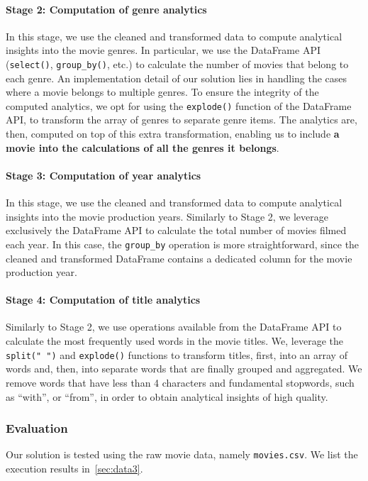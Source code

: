\documentclass[acmlarge]{acmart}
\begin{document}
  \paragraph{Stage 2: Computation of genre analytics} In this stage, we use the cleaned and transformed data to compute analytical insights into the movie genres. In particular, we use the DataFrame API (\texttt{select()}, \texttt{group\_by()}, etc.) to calculate the number of movies that belong to each genre. An implementation detail of our solution lies in handling the cases where a movie belongs to multiple genres. To ensure the integrity of the computed analytics, we opt for using the \texttt{explode()} function of the DataFrame API, to transform the array of genres to separate genre items. The analytics are, then, computed on top of this extra transformation, enabling us to include \textbf{a movie into the calculations of all the genres it belongs}.

  \paragraph{Stage 3: Computation of year analytics} In this stage, we use the cleaned and transformed data to compute analytical insights into the movie production years. Similarly to Stage 2, we leverage exclusively the DataFrame API to calculate the total number of movies filmed each year. In this case, the \texttt{group\_by} operation is more straightforward, since the cleaned and transformed DataFrame contains a dedicated column for the movie production year.

  \paragraph{Stage 4: Computation of title analytics} Similarly to Stage 2, we use operations available from the DataFrame API to calculate the most frequently used words in the movie titles. We, leverage the \texttt{split(" ")} and \texttt{explode()} functions to transform titles, first, into an array of words and, then, into separate words that are finally grouped and aggregated. We remove words that have less than 4 characters and fundamental stopwords, such as ``with'', or ``from'', in order to obtain analytical insights of high quality.

  \subsubsection{Evaluation} Our solution is tested using the raw movie data, namely \texttt{movies.csv}. We list the execution results in~\autoref{sec:data3}.
\end{document}
